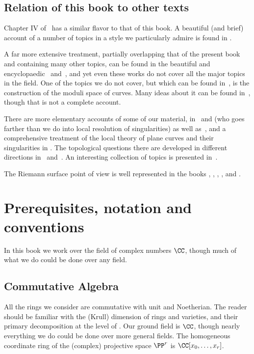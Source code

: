 \subsection{Relation of this book to other texts} 
Chapter IV of~\cite{Hartshorne1977} has a similar flavor to that of this book. A beautiful (and brief) account of a number of topics in a style we particularly admire is found in \cite{MumfordCJ}.

A far more extensive treatment, partially overlapping that of the present book and containing many other topics, can be found in the beautiful and encyclopaedic~\cite{ACGH} and~\cite{ACG}, and yet even these works do not cover all the major topics in the field. 
One of the topics we do not cover, but which can be found in~\cite{ACG}, is the construction of the moduli space of curves. Many  ideas  about it can be found in~\cite{HarrisMorrison1998}, though  that is not a complete account. 

There are more elementary accounts of some of our material, in~\cite{Fulton1989} and \cite{Walker1978} (who goes farther than we do into local resolution of singularities) as well as~\cite{Griffiths-curves}, and a comprehensive treatment of the local theory of plane curves and their singularities in \cite{Brieskorn1986}. The topological questions there are developed in different directions in~\cite{MR0239612} %
 and~\cite{MR817982}. %
 An interesting collection of topics is presented in~\cite{Clemens-Scrapbook}.

 The Riemann surface point of view is well represented in the books \cite{Forster}, \cite{Gunning}, \cite{Gunning-2}, \cite{Kirwan}, and \cite{Miranda}. 


\section{Prerequisites, notation and conventions}

In this book we work over the field of complex numbers $\CC$, though much of what we do
could be done over any field. 

\subsection{Commutative Algebra} 
All the rings we consider are commutative with unit and Noetherian.
The reader should be familiar with the (Krull) dimension of rings and varieties, and their primary decomposition at the level of \cite{Atiyah-MacDonald}. Our ground field is $\CC$, though nearly everything we do could be done over more general fields. The homogeneous coordinate ring of the (complex) projective space $\PP^r$ is $\CC[x_0, \dots, x_r]$. 

